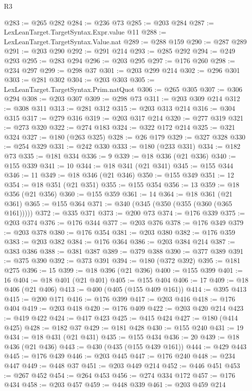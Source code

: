 \begin{lexlean}{R3}
\begin{coremodule}
@283 := @265 @282
@284 := @236 @73
@285 := @203 @284
@287 := LexLeanTarget.TargetSyntax.Expr.value @11
@288 := LexLeanTarget.TargetSyntax.Value.nat
@289 := @288 @159
@290 := @287 @289
@291 := @203 @290
@292 := @291 @214
@293 := @285 @292
@294 := @249 @293
@295 := @283 @294
@296 := @203 @295
@297 := @176 @260
@298 := @234 @297
@299 := @298 @37
@301 := @203 @299 @214
@302 := @296 @301
@303 := @281 @302
@304 := @203 @303
@305 := LexLeanTarget.TargetSyntax.Prim.natQuot
@306 := @265 @305
@307 := @306 @294
@308 := @203 @307
@309 := @298 @73
@311 := @203 @309 @214
@312 := @308 @311
@313 := @281 @312
@315 := @203 @313 @214
@316 := @304 @315
@317 := @279 @316
@319 := @203 @317 @214
@320 := @277 @319
@321 := @273 @320
@322 := @274 @183
@324 := @322 @172 @214
@325 := @321 @324
@327 := @180 (@263 @325)
@328 := @26 @179
@329 := @327 @328
@330 := @254 @329
@331 := @242 @330
@333 := @180 (@233 @331)
@334 := @182 @73
@335 := @181 @334
@336 := 9
@339 := @18 @336 (@21 @336)
@340 := @155 @339
@341 := 10
@344 := @18 @341 (@21 @341)
@345 := @155 @344
@346 := 11
@349 := @18 @346 (@21 @346)
@350 := @155 @349
@351 := 12
@354 := @18 @351 (@21 @351)
@355 := @155 @354
@356 := 13
@359 := @18 @356 (@21 @356)
@360 := @155 @359
@361 := 14
@364 := @18 @361 (@21 @361)
@365 := @155 @364
@371 := @340 (@345 (@350 (@355 (@360 (@365 @161)))))
@372 := @335 @371
@373 := @200 @73
@374 := @176 @339
@375 := @203 @374
@376 := @176 @344
@377 := @203 @376
@378 := @176 @349
@379 := @203 @378
@380 := @176 @354
@381 := @203 @380
@382 := @176 @359
@383 := @203 @382
@384 := @176 @364
@386 := @203 @384 @214
@387 := @383 @386
@388 := @381 @387
@389 := @379 @388
@390 := @377 @389
@391 := @375 @390
@392 := @373 @391
@394 := @180 (@372 @392)
@395 := @181 @275
@396 := 15
@399 := @18 @396 (@21 @396)
@400 := @155 @399
@401 := 16
@404 := @18 @401 (@21 @401)
@405 := @155 @404
@406 := 17
@409 := @18 @406 (@21 @406)
@413 := @400 (@405 (@155 @409 @161))
@414 := @395 @413
@415 := @200 @171
@416 := @176 @399
@417 := @203 @416
@418 := @176 @404
@419 := @203 @418
@420 := @176 @409
@422 := @203 @420 @214
@423 := @419 @422
@424 := @417 @423
@425 := @415 @424
@427 := @180 (@414 @425)
@428 := @182 @37
@429 := @181 @428
@430 := @155 @240
@431 := 19
@434 := @18 @431 (@21 @431)
@435 := @155 @434
@436 := 20
@439 := @18 @436 (@21 @436)
@443 := @430 (@435 (@155 @439 @161))
@444 := @429 @443
@445 := @176 @439
@446 := @203 @445
@447 := @176 @240
@448 := @234 @447
@449 := @448 @37
@451 := @203 @449 @214
@452 := @446 @451
@453 := @267 @452
@454 := @264 @453
@456 := @274 @334 @172
@457 := @176 @434
@458 := @203 @457
@459 := @448 @339
@461 := @203 @459 @214

\end{coremodule}
\end{lexlean}

